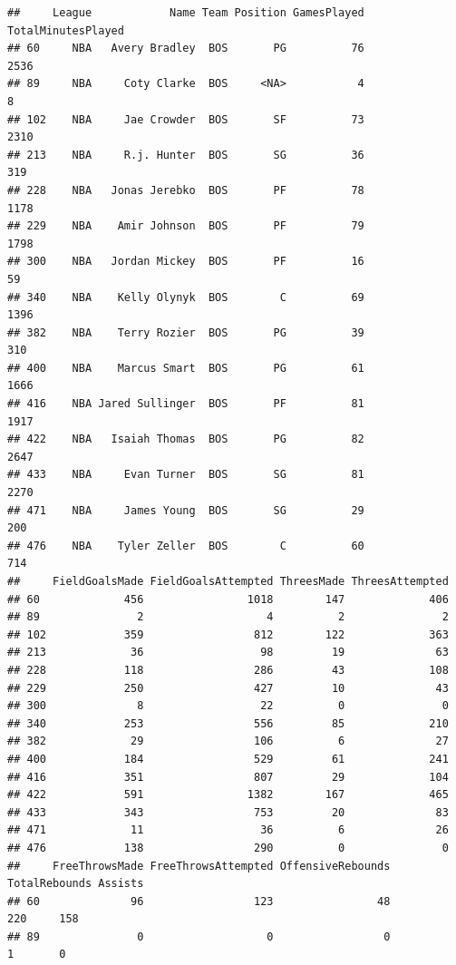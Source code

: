 \documentclass[]{book}
\theoremstyle{definition}
\theoremstyle{definition}
\theoremstyle{remark}
\begin{document}
\begin{verbatim}
##     League            Name Team Position GamesPlayed TotalMinutesPlayed
## 60     NBA   Avery Bradley  BOS       PG          76               2536
## 89     NBA     Coty Clarke  BOS     <NA>           4                  8
## 102    NBA     Jae Crowder  BOS       SF          73               2310
## 213    NBA     R.j. Hunter  BOS       SG          36                319
## 228    NBA   Jonas Jerebko  BOS       PF          78               1178
## 229    NBA    Amir Johnson  BOS       PF          79               1798
## 300    NBA   Jordan Mickey  BOS       PF          16                 59
## 340    NBA    Kelly Olynyk  BOS        C          69               1396
## 382    NBA    Terry Rozier  BOS       PG          39                310
## 400    NBA    Marcus Smart  BOS       PG          61               1666
## 416    NBA Jared Sullinger  BOS       PF          81               1917
## 422    NBA   Isaiah Thomas  BOS       PG          82               2647
## 433    NBA     Evan Turner  BOS       SG          81               2270
## 471    NBA     James Young  BOS       SG          29                200
## 476    NBA    Tyler Zeller  BOS        C          60                714
##     FieldGoalsMade FieldGoalsAttempted ThreesMade ThreesAttempted
## 60             456                1018        147             406
## 89               2                   4          2               2
## 102            359                 812        122             363
## 213             36                  98         19              63
## 228            118                 286         43             108
## 229            250                 427         10              43
## 300              8                  22          0               0
## 340            253                 556         85             210
## 382             29                 106          6              27
## 400            184                 529         61             241
## 416            351                 807         29             104
## 422            591                1382        167             465
## 433            343                 753         20              83
## 471             11                  36          6              26
## 476            138                 290          0               0
##     FreeThrowsMade FreeThrowsAttempted OffensiveRebounds TotalRebounds Assists
## 60              96                 123                48           220     158
## 89               0                   0                 0             1       0

\end{verbatim}
\end{document}
